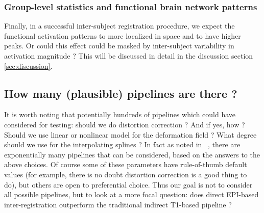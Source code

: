 

\subsubsection{Group-level statistics and functional brain network patterns}
Finally, in a successful inter-subject registration procedure, we
expect the functional activation patterns to more localized in space
and to have higher peaks. Or could this effect could be
masked by inter-subject variability in activation magnitude ?
This will be discussed in detail in the discussion section \ref{sec:discussion}.

\subsection{How many (plausible) pipelines are there ?}
It is worth noting that potentially hundreds of pipelines which could
have considered for testing: should we do distortion correction ? And
if yes, how ? Should we use linear or nonlinear model for the
deformation field ?
%
What degree should we use for the interpolating splines ? In fact as
noted in ~\citep{Poldrack059188}, there are exponentially many pipelines
that can be considered, based on the answers to the above choices.
%
Of course some of these parameters have rule-of-thumb default values
(for example, there is no doubt distortion correction is a good thing
to do), but others are open to preferential choice. Thus our goal is
not to consider all possible pipelines, but to look at a more focal
question: does direct EPI-based inter-registration outperform the
traditional indirect T1-based pipeline ?


